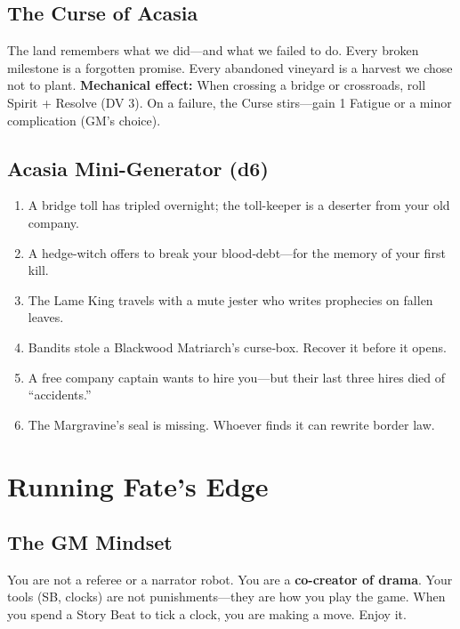 \documentclass[10pt]{article}
\begin{document}
\subsection{The Curse of Acasia}
The land remembers what we did—and what we failed to do. Every broken milestone is a forgotten promise. Every abandoned vineyard is a harvest we chose not to plant.
\textbf{Mechanical effect:} When crossing a bridge or crossroads, roll Spirit + Resolve (DV 3). On a failure, the Curse stirs—gain 1 Fatigue or a minor complication (GM's choice).

\subsection{Acasia Mini-Generator (d6)}
\begin{enumerate}[leftmargin=*]
    \item A bridge toll has tripled overnight; the toll-keeper is a deserter from your old company.
    \item A hedge-witch offers to break your blood‑debt—for the memory of your first kill.
    \item The Lame King travels with a mute jester who writes prophecies on fallen leaves.
    \item Bandits stole a Blackwood Matriarch's curse‑box. Recover it before it opens.
    \item A free company captain wants to hire you—but their last three hires died of ``accidents.''
    \item The Margravine's seal is missing. Whoever finds it can rewrite border law.
\end{enumerate}

\section{Running Fate's Edge}

\subsection{The GM Mindset}
You are not a referee or a narrator robot. You are a \textbf{co-creator of drama}. Your tools (SB, clocks) are not punishments—they are how you play the game. When you spend a Story Beat to tick a clock, you are making a move. Enjoy it.
\end{document}
